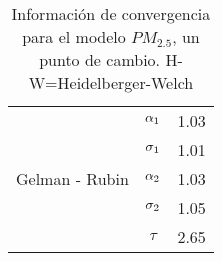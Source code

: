 \begin{table}[!h]
\begin{tabular}{|l|c|l|l|l|l|l|}
\multirow{5}{2.5cm}{Gelman - Rubin} & $\alpha_1$ & \multicolumn{5}{|c|}{1.03}\\ \cline{2-7}
&$\sigma_1$ &  \multicolumn{5}{|c|}{1.01} \\ \cline{2-7}
&$\alpha_2$ &  \multicolumn{5}{|c|}{1.03} \\ \cline{2-7}
&$\sigma_2$ &  \multicolumn{5}{|c|}{1.05} \\ \cline{2-7}
&$\tau$ &  \multicolumn{5}{|c|}{2.65} \\ \cline{1-7}



\end{tabular}
\caption{Información de convergencia para el modelo $PM_{2.5}$, un punto de cambio. H-W=Heidelberger-Welch}
\label{convergencia_updc_pm25}
\end{table}



